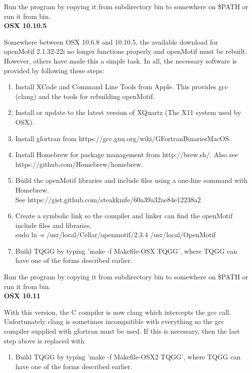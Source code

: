 \documentclass{article}
\begin{document}
Run the program by copying it from subdirectory bin to somewhere on \$PATH or run it from bin. \\

{\bf{OSX 10.10.5}}

Somewhere between OSX 10.6.8 and 10.10.5, the available download for openMotif 2.1.32-22i no longer 
functions properly and openMotif must be rebuilt. However, others have made this a simple task.
In all, the necessary software is provided by following these steps:
\begin{enumerate}
 \item Install XCode and Command Line Tools from Apple. This provides gcc (clang) and the tools
 for rebuilding openMotif.
 \item Install or update to the latest version of XQuartz (The X11 system used by OSX). 
 \item Install gfortran from https://gcc.gnu.org/wiki/GFortranBinariesMacOS.
 \item Install Homebrew for package management from http://brew.sh/. Also see https://github.com/Homebrew/homebrew.
 \item Build the openMotif libraries and include files using a one-line command with Homebrew.\\ 
 See https://gist.github.com/steakknife/60a39a32ae84e12238a2
 \item Create a symbolic link so the compiler and linker can find the openMotif include files and libraries.\\
 sudo ln -s /usr/local/Cellar/openmotif/2.3.4 /usr/local/OpenMotif
 \item Build TQGG by typing 'make -f Makefile-OSX TQGG', where TQGG can have one of the forms described earlier.
\end{enumerate}

Run the program by copying it from subdirectory bin to somewhere on \$PATH or run it from bin. \\ 

{\bf{OSX 10.11}}

With this version, the C compiler is now clang which intercepts the gcc call. Unfortunately clang is sometimes
incompatible with everything so the gcc compiler supplied with gfortran must be used. If this is necessary,
then the last step above is replaced with

\begin{enumerate}
 \item Build TQGG by typing 'make -f Makefile-OSX2 TQGG', where TQGG can have one of the forms described earlier.
\end{enumerate}
\end{document}
